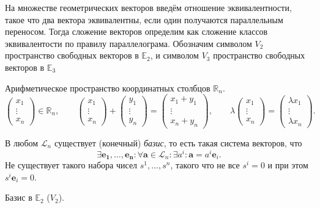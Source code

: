 \begin{enumerate}
\begin{example}
  На множестве геометрических векторов введём отношение эквивалентности, такое что два вектора
  эквивалентны, если один получаются параллельным переносом. Тогда сложение векторов определим
  как сложение классов эквивалентости по правилу параллелограма. 
   Обозначим символом $V_2$ пространство свободных векторов в $\mathbb E_2$,
  и символом $V_3$ пространство свободных векторов в $\mathbb E_3$
\end{example}

\begin{example}
  Арифметическое пространство координатных столбцов $\mathbb{R}_n$.
  \[
    \begin{pmatrix}
      x_1 \\
      \vdots \\
      x_n
    \end{pmatrix} \in \mathbb{R}_n, \qquad
    \begin{pmatrix}
      x_1 \\
      \vdots \\
      x_n
    \end{pmatrix} + \begin{pmatrix}
      y_1 \\
      \vdots \\
      y_n
    \end{pmatrix} = 
    \begin{pmatrix}
      x_1 + y_1 \\
      \vdots \\
      x_n + y_n
    \end{pmatrix}, \qquad
    \lambda \begin{pmatrix}
      x_1 \\
      \vdots \\
      x_n
      \end{pmatrix} = \begin{pmatrix} \lambda x_1 \\ \vdots \\ \lambda x_n
    \end{pmatrix}.
  \]
\end{example}

В любом $\mathcal{L}_n$ существует (конечный) \textsl{базис}, то есть такая система векторов, что
\[
  \exists \mathbf{e_1}, \dots, \mathbf{e_n}: \forall \mathbf{a} \in \mathcal L_n: \exists
  a^i :  \mathbf{a} = a^i \mathbf{e}_i.
\]
Не существует такого набора чисел $s^1, \dots, s^n$, такого что не все $s^i = 0$
и при этом $s^i \mathbf{e}_i = 0$.

\begin{example}
  Базис в $\mathbb E_2$ ($V_2$). 
\end{example}


\end{enumerate}
